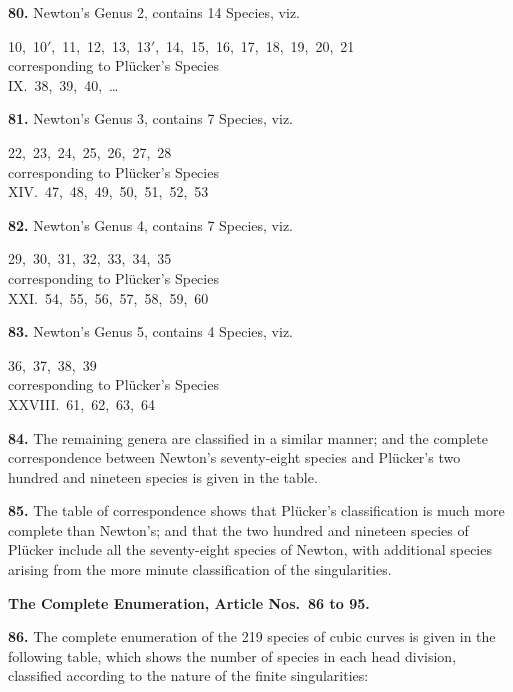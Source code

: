 \documentclass[11pt,a4paper]{article}
\theoremstyle{plain}
\theoremstyle{definition}
\begin{document}
\textbf{80.} Newton's Genus 2, contains 14 Species, viz.
\begin{center}
\small
10,\ 10$'$,\ 11,\ 12,\ 13,\ 13$'$,\ 14,\ 15,\ 16,\ 17,\ 18,\ 19,\ 20,\ 21 \\
\medskip
corresponding to Pl\"{u}cker's Species \\
IX.\ 38,\ 39,\ 40,\ \dots
\end{center}

\textbf{81.} Newton's Genus 3, contains 7 Species, viz.
\begin{center}
\small
22,\ 23,\ 24,\ 25,\ 26,\ 27,\ 28 \\
\medskip
corresponding to Pl\"{u}cker's Species \\
XIV.\ 47,\ 48,\ 49,\ 50,\ 51,\ 52,\ 53
\end{center}

\textbf{82.} Newton's Genus 4, contains 7 Species, viz.
\begin{center}
\small
29,\ 30,\ 31,\ 32,\ 33,\ 34,\ 35 \\
\medskip
corresponding to Pl\"{u}cker's Species \\
XXI.\ 54,\ 55,\ 56,\ 57,\ 58,\ 59,\ 60
\end{center}

\textbf{83.} Newton's Genus 5, contains 4 Species, viz.
\begin{center}
\small
36,\ 37,\ 38,\ 39 \\
\medskip
corresponding to Pl\"{u}cker's Species \\
XXVIII.\ 61,\ 62,\ 63,\ 64
\end{center}

\textbf{84.} The remaining genera are classified in a similar manner; and the complete correspondence between Newton's seventy-eight species and Pl\"{u}cker's two hundred and nineteen species is given in the table.

\textbf{85.} The table of correspondence shows that Pl\"{u}cker's classification is much more complete than Newton's; and that the two hundred and nineteen species of Pl\"{u}cker include all the seventy-eight species of Newton, with additional species arising from the more minute classification of the singularities.

\bigskip

\noindent\textbf{The Complete Enumeration, Article Nos.~86 to 95.}

\medskip

\textbf{86.} The complete enumeration of the 219 species of cubic curves is given in the following table, which shows the number of species in each head division, classified according to the nature of the finite singularities:
\end{document}
